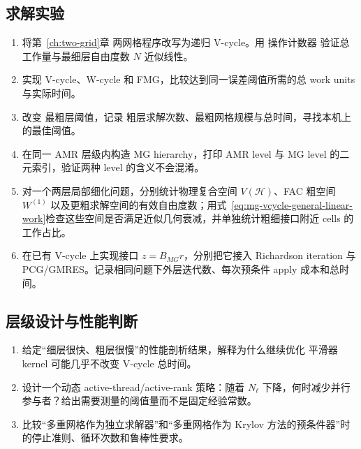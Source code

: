 \subsection*{求解实验}
\begin{enumerate}[label=\arabic*.]
\item 将第~\ref{ch:two-grid}章 两网格程序改写为递归 V-cycle。用 操作计数器 验证总工作量与最细层自由度数 $N$ 近似线性。
\item 实现 V-cycle、W-cycle 和 FMG，比较达到同一误差阈值所需的总 work units 与实际时间。
\item 改变 最粗层阈值，记录 粗层求解次数、最粗网格规模与总时间，寻找本机上的最佳阈值。
\item 在同一 AMR 层级内构造 MG hierarchy，打印 AMR level 与 MG level 的二元索引，验证两种 level 的含义不会混淆。
\item 对一个两层局部细化问题，分别统计物理复合空间 $V(\mathcal H)$、FAC 粗空间 $W^{(1)}$ 以及更粗求解空间的有效自由度数；用式~\eqref{eq:mg-vcycle-general-linear-work}检查这些空间是否满足近似几何衰减，并单独统计粗细接口附近 cells 的工作占比。
\item 在已有 V-cycle 上实现接口 $z=B_{MG}r$，分别把它接入 Richardson iteration 与 PCG/GMRES。记录相同问题下外层迭代数、每次预条件 apply 成本和总时间。
\end{enumerate}

\subsection*{层级设计与性能判断}
\begin{enumerate}[label=\arabic*.]
\item 给定“细层很快、粗层很慢”的性能剖析结果，解释为什么继续优化 平滑器 kernel 可能几乎不改变 V-cycle 总时间。
\item 设计一个动态 active-thread/active-rank 策略：随着 $N_\ell$ 下降，何时减少并行参与者？给出需要测量的阈值量而不是固定经验常数。
\item 比较“多重网格作为独立求解器”和“多重网格作为 Krylov 方法的预条件器”时的停止准则、循环次数和鲁棒性要求。
\end{enumerate}
